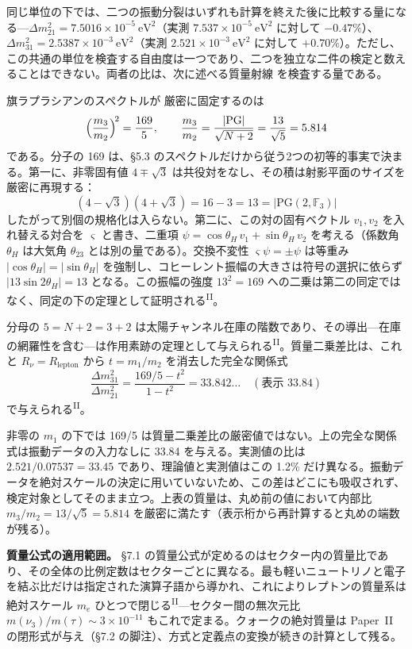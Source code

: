 \documentclass[fontsize=11pt,paper=a4,lualatex]{jlreq}
\newcommand{\PII}{\textsuperscript{\textup{II}}}
\begin{document}
同じ単位の下では、二つの振動分裂はいずれも計算を終えた後に比較する量になる---$\Delta m^2_{21} = 7.5016 \times 10^{-5}~\mathrm{eV}^2$（実測 $7.537 \times 10^{-5}~\mathrm{eV}^2$ に対して $-0.47\%$）、$\Delta m^2_{31} = 2.5387 \times 10^{-3}~\mathrm{eV}^2$（実測 $2.521 \times 10^{-3}~\mathrm{eV}^2$ に対して $+0.70\%$）。ただし、この共通の単位を検査する自由度は一つであり、二つを独立な二件の検定と数えることはできない。両者の比は、次に述べる質量射線 を検査する量である。

旗ラプラシアンのスペクトルが 厳密に固定するのは
\[\Bigl(\frac{m_3}{m_2}\Bigr)^{\!2} = \frac{169}{5},\qquad \frac{m_3}{m_2} = \frac{|\mathrm{PG}|}{\sqrt{N+2}} = \frac{13}{\sqrt{5}} = 5.814\]
である。分子の 169 は、§5.3 のスペクトルだけから従う2つの初等的事実で決まる。第一に、非零固有値 $4\mp\sqrt3$ は共役対をなし、その積は射影平面のサイズを厳密に再現する：
\begin{equation}
(4-\sqrt3)(4+\sqrt3) = 16 - 3 = 13 = |\mathrm{PG}(2,\mathbb F_3)|
\end{equation}
したがって別個の規格化は入らない。第二に、この対の固有ベクトル $v_1, v_2$ を入れ替える対合を $\varsigma$ と書き、二重項 $\psi = \cos\theta_H\,v_1 + \sin\theta_H\,v_2$ を考える（係数角 $\theta_H$ は大気角 $\theta_{23}$ とは別の量である）。交換不変性 $\varsigma\psi = \pm\psi$ は等重み $|\cos\theta_H| = |\sin\theta_H|$ を強制し、コヒーレント振幅の大きさは符号の選択に依らず $|13\sin 2\theta_H| = 13$ となる。この振幅の強度 $13^2 = 169$ への二乗は第二の同定ではなく、同定の下の定理として証明される\PII{}。

分母の $5 = N{+}2 = 3{+}2$ は太陽チャンネル在庫の階数であり、その導出---在庫の網羅性を含む---は作用素跡の定理として与えられる\PII{}。質量二乗差比は、これと $R_\nu = R_\mathrm{lepton}$ から $t = m_1/m_2$ を消去した完全な関係式
\[\frac{\Delta m^2_{31}}{\Delta m^2_{21}} = \frac{169/5 - t^2}{1 - t^2} = 33.842\ldots\quad(\text{表示 } 33.84)\]
で与えられる\PII{}。

非零の $m_1$ の下では 169/5 は質量二乗差比の厳密値ではない。上の完全な関係式は振動データの入力なしに 33.84 を与える。実測値の比は $2.521/0.07537 = 33.45$ であり、理論値と実測値はこの 1.2\% だけ異なる。振動データを絶対スケールの決定に用いていないため、この差はどこにも吸収されず、検定対象としてそのまま立つ。上表の質量は、丸め前の値において内部比 $m_3/m_2 = 13/\sqrt5 = 5.814$ を厳密に満たす（表示桁から再計算すると丸めの端数が残る）。



\noindent\textbf{質量公式の適用範囲。} §7.1 の質量公式が定めるのはセクター内の質量比であり、その全体の比例定数はセクターごとに異なる。最も軽いニュートリノと電子を結ぶ比だけは指定された演算子語から導かれ、これによりレプトンの質量系は絶対スケール $m_e$ ひとつで閉じる\PII{}---セクター間の無次元比 $m(\nu_3)/m(\tau) \sim 3\times10^{-11}$ もこれで定まる。クォークの絶対質量は Paper~II の閉形式が与え（§7.2 の脚注）、方式と定義点の変換が続きの計算として残る。
\end{document}
